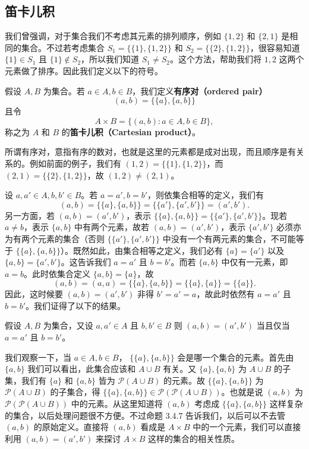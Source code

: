 \subsection{笛卡儿积}

我们曾强调，对于集合我们不考虑其元素的排列顺序，例如 $\{1, 2\}$ 和 $\{2, 1\}$ 是相同的集合。不过若考虑集合 $S_1 = \{\{1\}, \{1, 2\}\}$ 和 $S_2 = \{\{2\}, \{1, 2\}\}$，很容易知道 $\{1\} \in S_1$ 且 $\{1\} \notin S_2$，所以我们知道 $S_1 \neq S_2$。这个方法，帮助我们将 $1, 2$ 这两个元素做了排序。因此我们定义以下的符号。

\begin{definition}
假设 $A, B$ 为集合。若 $a \in A, b \in B$，我们定义{\bf 有序对（ordered pair）}
$$ (a, b) = \{\{a\}, \{a, b\}\} $$
且令
$$ A \times B = \{(a, b) : a \in A, b \in B\}, $$
称之为 $A$ 和 $B$ 的{\bf 笛卡儿积（Cartesian product）}。
\end{definition}

所谓有序对，意指有序的数对，也就是这里的元素都是成对出现，而且顺序是有关系的。例如前面的例子，我们有 $(1, 2) = \{\{1\}, \{1, 2\}\}$，而 $(2, 1) = \{\{2\}, \{1, 2\}\}$，故 $(1, 2) \neq (2, 1)$。

设 $a, a' \in A, b, b' \in B$。若 $a = a', b = b'$，则依集合相等的定义，我们有 %
$$ (a, b) = \{\{a\}, \{a, b\}\} = \{\{a'\}, \{a', b'\}\} = (a', b'). $$
另一方面，若 $(a, b) = (a', b')$，表示 $\{\{a\}, \{a, b\}\} = \{\{a'\}, \{a', b'\}\}$。现若 $a \neq b$，表示 $\{a, b\}$ 中有两个元素，故若 $(a, b) = (a', b')$，表示 $\{a', b'\}$ 必须亦为有两个元素的集合（否则 $\{\{a'\}, \{a', b'\}\}$ 中没有一个有两元素的集合，不可能等于 $\{\{a\}, \{a, b\}\}$）。既然如此，由集合相等之定义，我们必有 $\{a\} = \{a'\}$ 以及 $\{a, b\} = \{a', b'\}$。这告诉我们 $a = a'$ 且 $b = b'$。而若 $\{a, b\}$ 中仅有一元素，即 $a = b$。此时依集合定义 $\{a, b\} = \{a\}$，故
$$ (a, b) = (a, a) = \{\{a\}, \{a, b\}\} = \{\{a\}, \{a\}\} = \{\{a\}\}. $$
因此，这时候要 $(a, b) = (a', b')$ 非得 $b' = a' = a$，故此时依然有 $a = a'$ 且 $b = b'$。我们证得了以下的结果。

\begin{proposition}
假设 $A, B$ 为集合，又设 $a, a' \in A$ 且 $b, b' \in B$ 则 $(a, b) = (a', b')$ 当且仅当 $a = a'$ 且 $b = b'$。
\end{proposition}

我们观察一下，当 $a \in A, b \in B$， $\{\{a\}, \{a, b\}\}$ 会是哪一个集合的元素。首先由 $\{a, b\}$ 我们可以看出，此集合应该和 $A \cup B$ 有关。又 $\{a\}, \{a, b\}$ 为 $A \cup B$ 的子集，我们有 $\{a\}$ 和 $\{a, b\}$ 皆为 $\mathcal{P}(A \cup B)$ 的元素。故 $\{\{a\}, \{a, b\}\}$ 为 $\mathcal{P}(A \cup B)$ 的子集合，得 $\{\{a\}, \{a, b\}\} \in \mathcal{P}(\mathcal{P}(A \cup B))$。也就是说 $(a, b)$ 为 $\mathcal{P}(\mathcal{P}(A \cup B))$ 中的元素。从这里知道将 $(a, b)$ 考虑成 $\{\{a\}, \{a, b\}\}$ 这样复杂的集合，以后处理问题很不方便。不过命题 3.4.7 告诉我们，以后可以不去管 $(a, b)$ 的原始定义。直接将 $(a, b)$ 看成是 $A \times B$ 中的一个元素，我们可以直接利用 $(a, b) = (a', b')$ 来探讨 $A \times B$ 这样的集合的相关性质。

